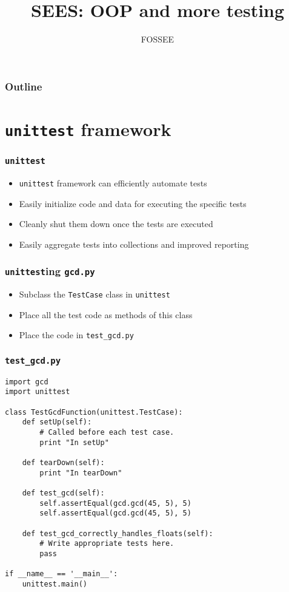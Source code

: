\documentclass[12pt,presentation]{beamer}
\title{SEES: OOP and more testing}
\author{FOSSEE}
\begin{document}
\maketitle

\begin{frame}
\frametitle{Outline}
\setcounter{tocdepth}{3}
\tableofcontents
\end{frame}




\section{\texttt{unittest} framework}

\begin{frame}[fragile]
  \frametitle{\texttt{unittest}}
  \begin{itemize}
  \item \texttt{unittest} framework can efficiently automate tests
  \item Easily initialize code and data for executing the specific
    tests
  \item Cleanly shut them down once the tests are executed
  \item Easily aggregate tests into collections and improved reporting
  \end{itemize}
\end{frame}


\begin{frame}[fragile]
  \frametitle{\texttt{unittest}ing \texttt{gcd.py}}
  \begin{itemize}
  \item Subclass the \texttt{TestCase} class in \texttt{unittest}
  \item Place all the test code as methods of this class
  \item Place the code in \texttt{test\_gcd.py} 
  \end{itemize}
\end{frame}

\begin{frame}
  \frametitle{\texttt{test\_gcd.py}}
\small
\begin{lstlisting}
import gcd
import unittest

class TestGcdFunction(unittest.TestCase):
    def setUp(self):
        # Called before each test case.
        print "In setUp"

    def tearDown(self):
        print "In tearDown"

    def test_gcd(self):
        self.assertEqual(gcd.gcd(45, 5), 5)
        self.assertEqual(gcd.gcd(45, 5), 5)

    def test_gcd_correctly_handles_floats(self):
        # Write appropriate tests here.
        pass

if __name__ == '__main__':
    unittest.main()
\end{lstlisting}
\end{frame}
\end{document}
